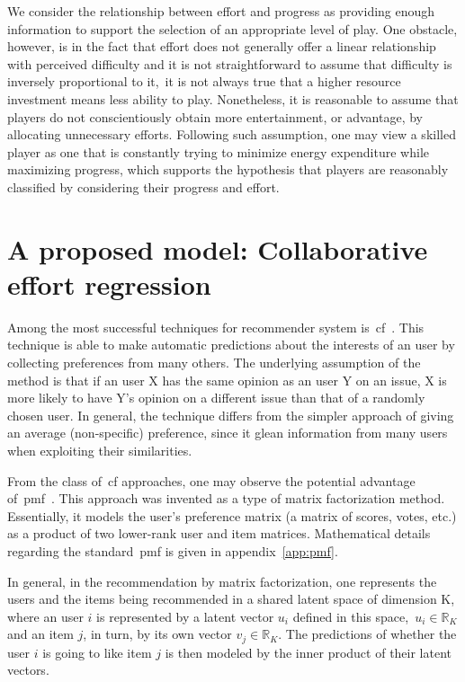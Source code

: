 We consider the relationship between effort and progress as providing enough information to support the selection of an appropriate level of play. One obstacle, however, is in the fact that effort does not generally offer a linear relationship with perceived difficulty and it is not straightforward to assume that difficulty is inversely proportional to it,~\ie it is not always true that a higher resource investment means less ability to play. 
Nonetheless, it is reasonable to assume that players do not conscientiously obtain more entertainment, or advantage, by allocating unnecessary efforts. Following such assumption, one may view a skilled player as one that is constantly trying to minimize energy expenditure while maximizing progress, which supports the hypothesis that players are reasonably classified by considering their progress and effort.

\section{A proposed model: Collaborative effort regression}

Among the most successful techniques for recommender system is~\gls{cf}~\citep{su_survey_2009, schafer_collaborative_2007}. 
This technique is able to make automatic predictions about the interests of an user by collecting preferences from many others. The underlying assumption of the method is that if an user X has the same opinion as an user Y on an issue, X is more likely to have Y's opinion on a different issue than that of a randomly chosen user. In general, the technique differs from the simpler approach of giving an average (non-specific) preference, since it glean information from many users when exploiting their similarities.

From the class of~\gls{cf} approaches, one may observe the potential advantage of~\gls{pmf}~\citep{mnih_probabilistic_2008}. This approach was invented as a type of matrix factorization method. Essentially, it models the user's preference matrix (a matrix of scores, votes, etc.) as a product of two lower-rank user and item matrices. Mathematical details regarding the standard~\gls{pmf} is given in appendix~\ref{app:pmf}. 

In general, in the recommendation by matrix factorization, one represents the users and the items being recommended in a shared latent space of dimension K, where an user $i$ is represented by a latent vector $u_{i}$ defined in this space,~\ie $u_{i} \in \mathbb{R}_{K}$ and an item $j$, in turn, by its own vector $v_{j} \in \mathbb{R}_{K}$. The predictions of whether the user $i$ is going to like item $j$ is then modeled by the inner product of their latent vectors.

